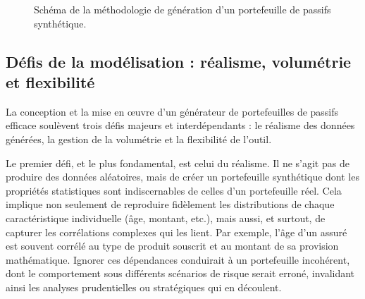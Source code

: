 \begin{figure}[h!]
    \centering
    \caption{Schéma de la méthodologie de génération d'un portefeuille de passifs synthétique.}
    \label{fig:methodologie_horizontale}
\end{figure}

\subsection{Défis de la modélisation : réalisme, volumétrie et flexibilité}

La conception et la mise en œuvre d'un générateur de portefeuilles de passifs efficace soulèvent trois défis majeurs et interdépendants : le réalisme des données générées, la gestion de la volumétrie et la flexibilité de l'outil.

Le premier défi, et le plus fondamental, est celui du réalisme. Il ne s'agit pas de produire des données aléatoires, mais de créer un portefeuille synthétique dont les propriétés statistiques sont indiscernables de celles d'un portefeuille réel. Cela implique non seulement de reproduire fidèlement les distributions de chaque caractéristique individuelle (âge, montant, etc.), mais aussi, et surtout, de capturer les corrélations complexes qui les lient. Par exemple, l'âge d'un assuré est souvent corrélé au type de produit souscrit et au montant de sa provision mathématique. Ignorer ces dépendances conduirait à un portefeuille incohérent, dont le comportement sous différents scénarios de risque serait erroné, invalidant ainsi les analyses prudentielles ou stratégiques qui en découlent.

